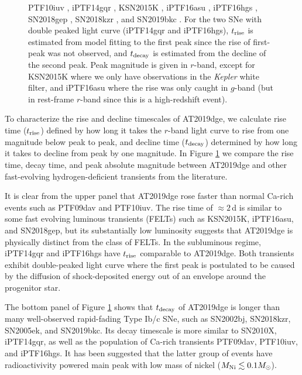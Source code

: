 \documentclass[twocolumn]{aastex63}
\begin{document}
\begin{CJK*}{UTF8}{gbsn}
\begin{figure}[htbp!]
{		PTF10iuv \citep{Kasliwal2012},
		iPTF14gqr \citep{De2018},
		KSN2015K \citep{Rest2018},
		 iPTF16asu	\citep{Whitesides2017}, 
		 iPTF16hgs \citep{DeKC2018},
		SN2018gep \citep{Ho2019},
		SN2018kzr \citep{McBrien2019}, 
		and SN2019bkc \citep{Chen2020}. 
		For the two SNe with double peaked light 
		curve (iPTF14gqr and iPTF16hgs), $t_{\rm rise}$ is estimated from model fitting to the first peak 
		since the rise of first-peak was not observed, and $t_{\rm decay}$ is estimated from the decline of 
		the second peak. Peak magnitude is given in $r$-band, except for KSN2015K where we 
		only have observations in the \textit{Kepler} white filter, and iPTF16asu where the rise was only 
		caught in $g$-band (but in rest-frame $r$-band since this is a high-redshift event).
		\label{fig:compare_mag}}
\end{figure}


To characterize the rise and decline timescales of AT2019dge, we calculate rise time ($t_{\rm rise}$) 
defined by how long it takes the $r$-band light curve to rise from one magnitude below peak to peak, 
and decline time ($t_{\rm decay}$) determined by how long it takes to decline from peak by one 
magnitude. In Figure \ref{fig:compare_mag} we compare the rise time, decay time, 
and peak absolute magnitude between AT2019dge and other fast-evolving hydrogen-deficient 
transients from the literature. 

It is clear from the upper panel that AT2019dge rose faster than normal Ca-rich events such as 
PTF09dav and PTF10iuv. The rise time of $\approx 2$\,d is similar to some fast evolving luminous 
transients (FELTs) such as KSN2015K, iPTF16asu, and SN2018gep, but its substantially low luminosity 
suggests that AT2019dge is physically distinct from the class of FELTs. In the subluminous regime, 
iPTF14gqr and iPTF16hgs have $t_{\rm rise}$ comparable to AT2019dge. Both transients exhibit 
double-peaked light curve where the first peak is postulated to be caused by the diffusion of 
shock-deposited energy out of an envelope around the progenitor star.
 
The bottom panel of Figure \ref{fig:compare_mag} shows that $t_{\rm decay}$ of AT2019dge is 
longer than many well-observed rapid-fading Type Ib/c SNe, such as SN2002bj, SN2018kzr, SN2005ek, 
and SN2019bkc. Its decay timescale is more similar to SN2010X, iPTF14gqr, as well as the population of 
Ca-rich transients PTF09dav, PTF10iuv, and iPTF16hgs. It has been suggested that the latter group of 
events have radioactivivity powered main peak with low mass of nickel ($M_{\rm Ni} \lesssim 0.1 
M_\odot$).


\end{CJK*}
\end{document}
